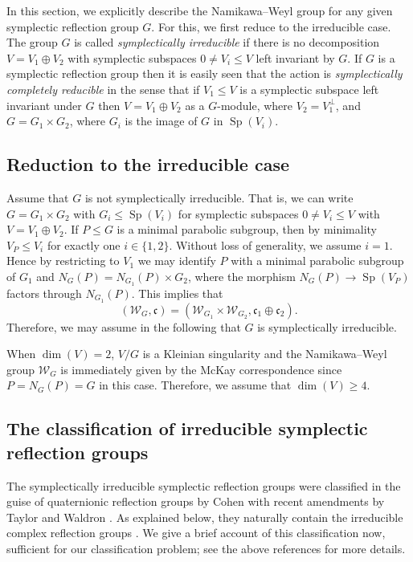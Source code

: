 \documentclass[a4paper]{amsart}
\theoremstyle{plain}
\theoremstyle{definition}
\theoremstyle{remark}
\DeclareMathOperator{\Sp}{Sp}
\begin{document}
In this section, we explicitly describe the Namikawa--Weyl group for any given symplectic reflection group \(G\).
For this, we first reduce to the irreducible case.
The group \(G\) is called \emph{symplectically irreducible} if there is no decomposition \(V = V_1\oplus V_2\) with symplectic subspaces \(0\neq V_i\leqslant V\) left invariant by \(G\). If $G$ is a symplectic reflection group then it is easily seen that the action is \emph{symplectically completely reducible} in the sense that if $V_1 \leqslant V$ is a symplectic subspace left invariant under $G$ then $V = V_1 \oplus V_2$ as a $G$-module, where $V_2 = V_1^{\perp}$, and $G = G_1 \times G_2$, where $G_i$ is the image of $G$ in $\Sp(V_i)$. 

\subsection{Reduction to the irreducible case}
Assume that \(G\) is not symplectically irreducible. That is, we can write \(G = G_1\times G_2\) with \(G_i\leqslant\Sp(V_i)\) for symplectic subspaces \(0\neq V_i\leqslant V\) with \(V = V_1 \oplus V_2\). If \(P\leqslant G\) is a minimal parabolic subgroup, then by minimality \(V_P \leqslant V_i\) for exactly one \(i\in \{1, 2\}\). Without loss of generality, we assume \(i = 1\).
Hence by restricting to \(V_1\) we may identify \(P\) with a minimal parabolic subgroup of \(G_1\) and $N_G(P) = N_{G_1}(P) \times G_2$, where the morphism $N_G(P) \to \Sp(V_P)$ factors through $N_{G_1}(P)$. This implies that 
\[
(\mathcal{W}_G,\mathfrak{c}) = (\mathcal{W}_{G_1} \times \mathcal{W}_{G_2},\mathfrak{c}_1 \oplus \mathfrak{c}_2).
\]
Therefore, we may assume in the following that \(G\) is symplectically irreducible.

When \(\dim(V) = 2\), \(V/G\) is a Kleinian singularity and the Namikawa--Weyl group \(\mathcal W_G\) is immediately given by the McKay correspondence since $P = N_G(P) = G$ in this case. Therefore, we assume that \(\dim(V) \geqslant 4\).

\subsection{The classification of irreducible symplectic reflection groups}
The symplectically irreducible symplectic reflection groups were classified in the guise of quaternionic reflection groups by Cohen \cite{Coh80} with recent amendments by Taylor \cite{Tay25} and Waldron \cite{Wal25}.
As explained below, they naturally contain the irreducible complex reflection groups \cite{ST54}. We give a brief account of this classification now, sufficient for our classification problem; see the above references for more details.
\end{document}
